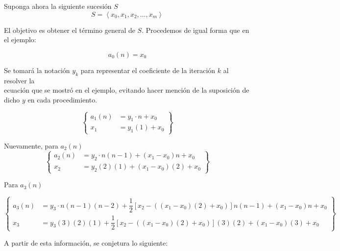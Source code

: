 
Suponga ahora la siguiente sucesión $S$
\[
    S = \left< x_0, x_1, x_2, \dots , x_m\right>
\]

El objetivo es obtener el término general de $S$.
Procedemos de igual forma que en el ejemplo:

\[a_0(n) = x_0\]

Se tomará la notación $y_k$ para representar el coeficiente
de la iteración $k$ al resolver la\\ ecuación que se mostró en el
ejemplo, evitando hacer mención de la suposición de dicho $y$ en cada
procedimiento.

\begin{equation*}
    \left\{
        \begin{aligned}
            a_1(n) &= y_1 \cdot n + x_0\\
            x_1 &= y_1(1) + x_0
        \end{aligned}
    \right\}
\end{equation*}

Nuevamente, para $a_2(n)$
\begin{equation*}
    \left\{
        \begin{aligned}
            a_2(n) &= y_2 \cdot n(n-1) + (x_1 - x_0)n + x_0\\
            x_2 &= y_2(2)(1) + (x_1 - x_0)(2) + x_0
        \end{aligned}  
    \right\}
\end{equation*}

Para $a_3(n)$

\begin{equation*}
    \left\{
        \begin{aligned}
            a_3(n) &= y_3 \cdot n(n-1)(n-2) + \dfrac{1}{2}[x_2 - ((x_1  - x_0)(2) + x_0)]n(n-1) + (x_1 - x_0)n + x_0\\
            x_3 &= y_3 (3)(2)(1) + \dfrac{1}{2}[x_2 - ((x_1  - x_0)(2) + x_0)](3)(2) + (x_1 - x_0)(3) + x_0
        \end{aligned}
    \right\}
\end{equation*}

A partir de esta información, se conjetura lo siguiente:

